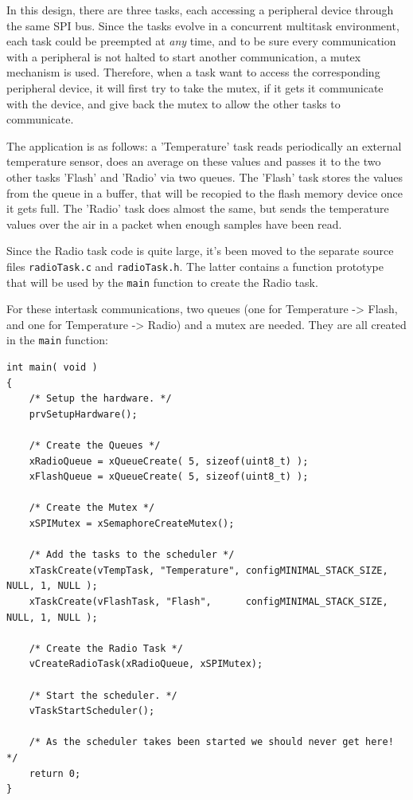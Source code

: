 \documentclass[11pt]{report}
\begin{document}
In this design, there are three tasks, each accessing a peripheral device through the same SPI bus. Since the tasks evolve in a concurrent multitask environment, each task could be preempted at \textit{any} time, and to be sure every communication with a peripheral is not halted to start another communication, a mutex mechanism is used. Therefore, when a task want to access the corresponding peripheral device, it will first try to take the mutex, if it gets it communicate with the device, and give back the mutex to allow the other tasks to communicate.

The application is as follows: a 'Temperature' task reads periodically an external temperature sensor, does an average on these values and passes it to the two other tasks 'Flash' and 'Radio' via two queues. The 'Flash' task stores the values from the queue in a buffer, that will be recopied to the flash memory device once it gets full. The 'Radio' task does almost the same, but sends the temperature values over the air in a packet when enough samples have been read.

Since the Radio task code is quite large, it's been moved to the separate source files \verb$radioTask.c$ and \verb$radioTask.h$. The latter contains a function prototype that will be used by the \verb$main$ function to create the Radio task.

For these intertask communications, two queues (one for Temperature -> Flash, and one for Temperature -> Radio) and a mutex are needed. They are all created in the \verb$main$ function:
\begin{verbatim}
int main( void )
{
    /* Setup the hardware. */
    prvSetupHardware();
    
    /* Create the Queues */
    xRadioQueue = xQueueCreate( 5, sizeof(uint8_t) );
    xFlashQueue = xQueueCreate( 5, sizeof(uint8_t) );
    
    /* Create the Mutex */
    xSPIMutex = xSemaphoreCreateMutex();
    
    /* Add the tasks to the scheduler */
    xTaskCreate(vTempTask, "Temperature", configMINIMAL_STACK_SIZE, NULL, 1, NULL );
    xTaskCreate(vFlashTask, "Flash",      configMINIMAL_STACK_SIZE, NULL, 1, NULL );
    
    /* Create the Radio Task */
    vCreateRadioTask(xRadioQueue, xSPIMutex);
    
    /* Start the scheduler. */
    vTaskStartScheduler();
    
    /* As the scheduler takes been started we should never get here! */
    return 0;
}
\end{verbatim}
\end{document}
